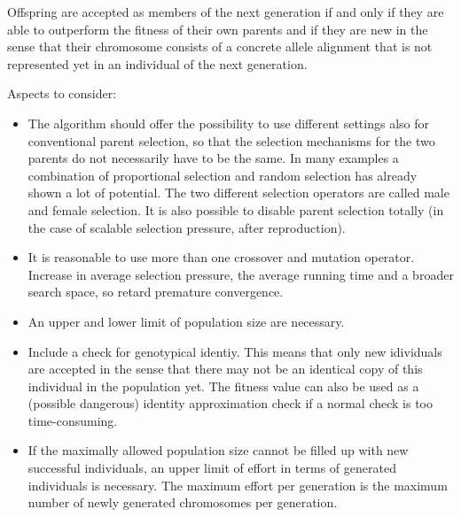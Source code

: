 \documentclass[12pt]{article}
\begin{document}
Offspring are accepted as members of the next generation if and only if they are able to outperform the fitness of their own parents and if they are new in the sense that their chromosome consists of a concrete allele alignment that is not represented yet in an individual of the next generation.

Aspects to consider:
\begin{itemize}
\item The algorithm should offer the possibility to use different settings also for conventional parent selection, so that the selection mechanisms for the two parents do not necessarily have to be the same. In many examples a combination of proportional selection and random selection has already shown a lot of potential. The two different selection operators are called male and female selection. It is also possible to disable parent selection totally (in the case of scalable selection pressure, after reproduction).
\item It is reasonable to use more than one crossover and mutation operator. Increase in average selection pressure, the average running time and a broader search space, so retard premature convergence.
\item An upper and lower limit of population size are necessary.
\item Include a check for genotypical identiy. This means that only new idividuals are accepted in the sense that there may not be an identical copy of this individual in the population yet. The fitness value can also be used as a (possible dangerous) identity approximation check if a normal check is too time-consuming.
\item If the maximally allowed population size cannot be filled up with new successful individuals, an upper limit of effort in terms of generated individuals is necessary. The maximum effort per generation is the maximum number of newly generated chromosomes per generation.
\end{itemize}
\end{document}
